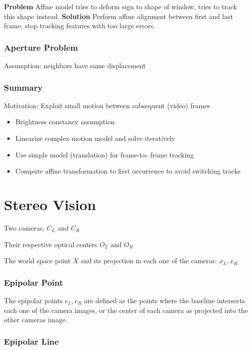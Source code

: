 \textbf{Problem}  Affine model tries to deform sign to shape of window, tries to track this shape instead. 
\textbf{Solution} Perform affine alignment between first and last frame, stop tracking features with too large errors. 

\subsubsection{Aperture Problem}

Assumption: neighbors have same displacement

\subsubsection{Summary}
Motivation: Exploit small motion between subsequent (video) frames

\begin{itemize}
\item  Brightness constancy assumption
\item  Linearize complex motion model and solve iteratively
\item  Use simple model (translation) for frame-to- frame tracking
\item  Compute affine transformation to first occurrence to avoid switching tracks
\end{itemize}


\section{Stereo Vision}

Two cameras, $C_L$ and $C_R$

Their respective optical centers $O_L$ and $O_R$

The world space point $X$ and its projection in each one of the cameras: $x_L, x_R$

\subsubsection{Epipolar Point}

The epipolar points $e_L, e_R$ are defined as the points where the baseline intersects each one of the camera images, or the center of each camera as projected into the other cameras image.

\subsubsection{Epipolar Line}

